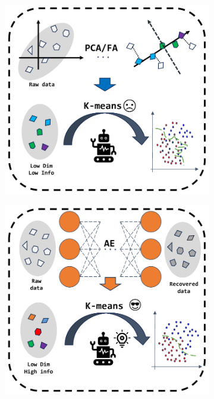 \documentclass{article} %
\begin{document}
\begin{figure}[!ht]
   \centering
   \begin{subfigure}{.49\textwidth}
       \centering
       \includegraphics[width=1.0\linewidth]{./figures/PCA.pdf}
       \vspace{-5pt}
       \label{fig:sketch1}
   \end{subfigure}
   \hfill
   \begin{subfigure}{.49\textwidth}
       \centering
       \includegraphics[width=1.0\linewidth]{./figures/AE.pdf}

\end{subfigure}
\end{figure}
\end{document}
